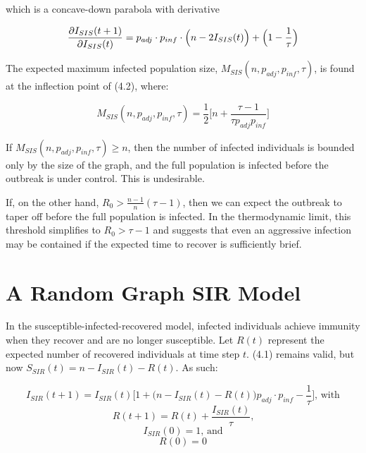 \documentclass[psamsfonts]{amsart}
\theoremstyle{definition}
\theoremstyle{remark}
\numberwithin{equation}{section}
\begin{document}
which is a concave-down parabola with derivative

\begin{equation}
\pdv{I_{SIS}(t+1)}{I_{SIS}(t)} = p_{adj} \cdot p_{inf} \cdot \Big(n-2 I_{SIS}(t)\Big) + \Big(1 - \frac{1}{\tau}\Big) \nonumber
\end{equation}

The expected maximum infected population size, $M_{SIS}(n, p_{adj}, p_{inf}, \tau)$, is found at the inflection point of (4.2), where:

\begin{equation}
M_{SIS}(n, p_{adj}, p_{inf}, \tau) = \frac{1}{2}\Big[n + \frac{\tau - 1}{\tau p_{adj}p_{inf}}\Big]
\end{equation}

If $M_{SIS}(n, p_{adj}, p_{inf}, \tau) \geq n$, then the number of infected individuals is bounded only by the size of the graph, and the full population is infected before the outbreak is under control. This is undesirable.

If, on the other hand, $R_0 > \frac{n-1}{n}(\tau - 1)$, then we can expect the outbreak to taper off before the full population is infected. In the thermodynamic limit, this threshold simplifies to $R_0 > \tau - 1$ and suggests that even an aggressive infection may be contained if the expected time to recover is sufficiently brief.

\section{A Random Graph SIR Model}

In the susceptible-infected-recovered model, infected individuals achieve immunity when they recover and are no longer susceptible. Let $R(t)$ represent the expected number of recovered individuals at time step $t$. (4.1) remains valid, but now $S_{SIR}(t) = n - I_{SIR}(t) - R(t)$. As such:

\begin{equation}
I_{SIR}(t+1) = I_{SIR}(t)\Bigg[1 + \Big(n - I_{SIR}(t) - R(t)\Big)p_{adj} \cdot p_{inf} -  \frac{1}{\tau}\Bigg] \text{, with}
\end{equation}
\begin{equation}
R(t+1) = R(t) + \frac{I_{SIR}(t)}{\tau} \text{,} \nonumber
\end{equation}
\begin{equation}
I_{SIR}(0)=1 \text{, and} \nonumber
\end{equation}
\begin{equation}
R(0)=0 \nonumber
\end{equation}
\end{document}
